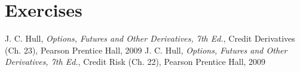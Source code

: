 \section*{Exercises}


\begin{thebibliography}{9}
 J. C. Hull, \emph{Options, Futures and Other Derivatives, 7th Ed.}, Credit Derivatives (Ch. 23), Pearson Prentice Hall, 2009
 J. C. Hull, \emph{Options, Futures and Other Derivatives, 7th Ed.}, Credit Risk (Ch. 22), Pearson Prentice Hall, 2009
\end{thebibliography}
